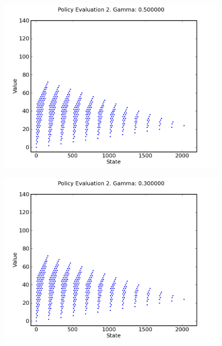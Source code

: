 \documentclass[a4paper]{article}
\begin{document}
\begin{figure}[h]
\center
\includegraphics[scale=0.8]{gamma_iteration/gamma_5_2.png}
\end{figure}

\begin{figure}[h]
\center
\includegraphics[scale=0.8]{gamma_iteration/gamma_3_2.png}
\end{figure}
\end{document}
